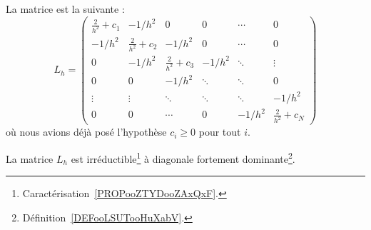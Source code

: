 	La matrice est la suivante :
	\begin{equation}
		L_h=\begin{pmatrix}
			\frac{ 2 }{ h^2 }+c_1 & -1/h^2                & 0                     & 0      & \cdots & 0                     \\
			-1/h^2                & \frac{ 2 }{ h^2 }+c_2 & -1/h^2                & 0      & \cdots & 0                     \\
			0                     & -1/h^2                & \frac{ 2 }{ h^2 }+c_3 & -1/h^2 & \ddots & \vdots                \\
			0                     & 0                     & -1/h^2                & \ddots & \ddots & 0                     \\
			\vdots                & \vdots                & \ddots                & \ddots & \ddots & -1/h^2                \\
			0                     & 0                     & \cdots                & 0      & -1/h^2 & \frac{ 2 }{ h^2 }+c_N
		\end{pmatrix}
	\end{equation}
	où nous avions déjà posé l'hypothèse \( c_i\geq 0\) pour tout \( i\).

	\begin{lemma}       \label{LEMooGGHQooNnVsuu}
		La matrice \( L_h\) est irréductible\footnote{Caractérisation~\ref{PROPooZTYDooZAxQxF}.} à diagonale fortement dominante\footnote{Définition~\ref{DEFooLSUTooHuXabV}.}.
	\end{lemma}


